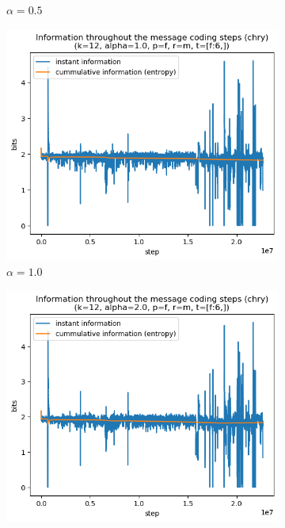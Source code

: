 \documentclass{article}
\begin{document}
\begin{figure}
\begin{subfigure}[b]{0.3\textwidth}
\begin{center}
        \end{center}
        \caption{$\alpha = 0.5$}
        \label{fig:results-alpha-0.5}
    \end{subfigure}
    \hfill
    \begin{subfigure}[b]{0.3\textwidth}
        \begin{center}
            \includegraphics[width=1.0\linewidth]{../scripts/images/chry_12_1.0_f_m_[f:6,].png}
        \end{center}
        \caption{$\alpha = 1.0$}
        \label{fig:results-alpha-1.0}
    \end{subfigure}
    \begin{subfigure}[b]{0.3\textwidth}
        \begin{center}
            \includegraphics[width=1.0\linewidth]{../scripts/images/chry_12_2.0_f_m_[f:6,].png}

\end{center}
\end{subfigure}
\end{figure}
\end{document}
